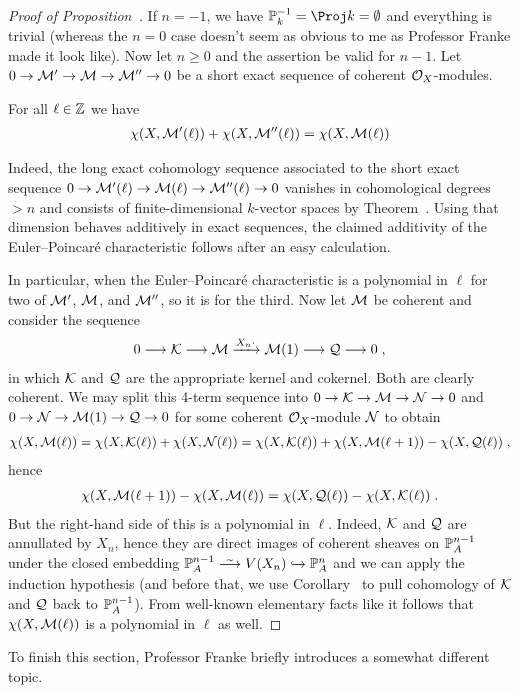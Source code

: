 \documentclass[a4paper,parskip=half,numbers=enddot, DIV=12]{scrreprt}
\begin{document}
\begin{proof}[Proof of Proposition~]
	If $n=-1$, we have $\IP_k^{-1}=\Proj k=\emptyset$ and everything is trivial (whereas the $n=0$ case doesn't seem as obvious to me as Professor Franke made it look like). Now let $n\geq 0$ and the assertion be valid for $n-1$. Let $0\morphism \Mm'\morphism\Mm\morphism\Mm''\morphism 0$ be a short exact sequence of coherent $\mathcal{O}_X$-modules. 
	\begin{claim}
		For all $\ell\in \mathbb{Z}$ we have
		\begin{align*}
			\chi(X,\mathcal{M}'(\ell))+\chi(X,\mathcal{M}''(\ell))=\chi(X,\mathcal{M}(\ell))
		\end{align*}
	\end{claim}
	Indeed, the long exact cohomology sequence associated to the short exact sequence $0\morphism \Mm'(\ell)\morphism\Mm(\ell)\morphism\Mm''(\ell)\morphism 0$ vanishes in cohomological degrees $>n$ and consists of finite-dimensional $k$-vector spaces by Theorem~. Using that dimension behaves additively in exact sequences, the claimed additivity of the Euler--Poincaré characteristic follows after an easy calculation.
	
	In particular, when the Euler--Poincaré characteristic is a polynomial in $\ell$ for two of $\mathcal{M}'$, $\mathcal{M}$, and $\mathcal{M}''$, so it is for the third. Now let $\mathcal{M}$ be coherent and consider the sequence
	\begin{align*}
		0\morphism \Kk\morphism \Mm\xrightarrow{X_n\cdot }\Mm(1)\morphism \Qq\morphism 0\;,
	\end{align*}
	in which $\mathcal{K}$ and $\mathcal{Q}$ are the appropriate kernel and cokernel. Both are clearly coherent. We may split this 4-term sequence into $0\morphism \Kk\morphism \Mm\morphism \Nn\morphism 0$ and $0\morphism\Nn\morphism\Mm(1)\morphism \Qq\morphism 0$ for some coherent $\mathcal{O}_X$-module $\mathcal{N}$ to obtain
	\begin{align*}
		\chi(X,\mathcal{M}(\ell))=\chi(X,\mathcal{K}(\ell))+\chi(X,\mathcal{N}(\ell))=\chi(X,\mathcal{K}(\ell))+\chi(X,\mathcal{M}(\ell+1))-\chi(X,\mathcal{Q}(\ell))\;,
	\end{align*}
	hence
	\begin{align*}
		\chi(X,\mathcal{M}(\ell+1))-\chi(X,\mathcal{M}(\ell))=\chi(X,\mathcal{Q}(\ell))-\chi(X,\mathcal{K}(\ell))\;.
	\end{align*}
	But the right-hand side of this is a polynomial in $\ell$. Indeed, $\mathcal{K}$ and $\mathcal{Q}$ are annullated by $X_n$, hence they are direct images of coherent sheaves on $\mathbb{P}_A^{n-1}$ under the closed embedding $\IP_A^{n-1}\isomorphism V(X_n)\monomorphism \IP_A^n$ and we can apply the induction hypothesis (and before that, we use Corollary~ to pull cohomology of $\mathcal{K}$ and $\mathcal{Q}$ back to $\mathbb{P}_A^{n-1}$). From well-known elementary facts like \cite[Fact~3.1.1]{alg2} it follows that $\chi(X,\mathcal{M}(\ell))$ is a polynomial in $\ell$ as well.
\end{proof}
To finish this section, Professor Franke briefly introduces a somewhat different topic.
\end{document}
